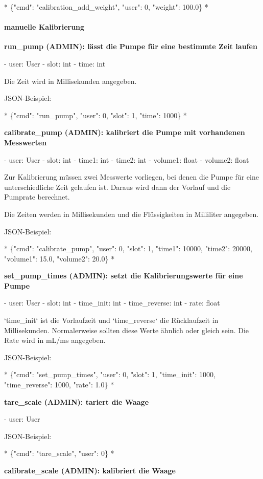 *
\{"cmd": "calibration\_add\_weight", "user": 0, "weight": 100.0\}
*

\paragraph{ manuelle Kalibrierung}

\textbf{ run\_pump (ADMIN): lässt die Pumpe für eine bestimmte Zeit laufen}

- user: User
- slot: int
- time: int

Die Zeit wird in Millisekunden angegeben.

JSON-Beispiel:

*
\{"cmd": "run\_pump", "user": 0, "slot": 1, "time": 1000\}
*

\textbf{ calibrate\_pump (ADMIN): kalibriert die Pumpe mit vorhandenen Messwerten}

- user: User
- slot: int
- time1: int
- time2: int
- volume1: float
- volume2: float

Zur Kalibrierung müssen zwei Messwerte vorliegen, bei denen die Pumpe für eine unterschiedliche Zeit gelaufen ist. Daraus wird dann der Vorlauf und die Pumprate berechnet.

Die Zeiten werden in Millisekunden und die Flüssigkeiten in Milliliter angegeben.

JSON-Beispiel:

*
\{"cmd": "calibrate\_pump", "user": 0, "slot": 1, "time1": 10000, "time2": 20000, "volume1": 15.0, "volume2": 20.0\}
*

\textbf{ set\_pump\_times (ADMIN): setzt die Kalibrierungswerte für eine Pumpe}

- user: User
- slot: int
- time\_init: int
- time\_reverse: int
- rate: float

`time\_init` ist die Vorlaufzeit und `time\_reverse` die Rücklaufzeit in Millisekunden. Normalerweise sollten diese Werte ähnlich oder gleich sein. Die Rate wird in mL/ms angegeben.

JSON-Beispiel:

*
\{"cmd": "set\_pump\_times", "user": 0, "slot": 1, "time\_init": 1000, "time\_reverse": 1000, "rate": 1.0\}
*

\textbf{ tare\_scale (ADMIN): tariert die Waage}

- user: User

JSON-Beispiel:

*
\{"cmd": "tare\_scale", "user": 0\}
*

\textbf{ calibrate\_scale (ADMIN): kalibriert die Waage}

